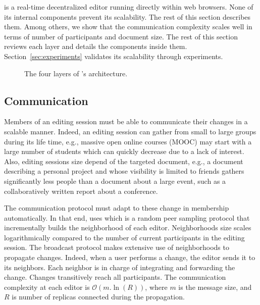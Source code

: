 \CRATE is a real-time decentralized editor running directly within web
browsers. None of its internal components prevent its scalability. The rest of
this section describes them. Among others, we show that the communication
complexity scales well in terms of number of participants and document size. The
rest of this section reviews each layer and details the components inside
them. Section~\ref{sec:experiments} validates its scalability through
experiments.

\begin{figure}
  \centering
  
  \caption{\label{fig:architecture}The four layers of \CRATE's architecture.}
\end{figure}

\subsection{Communication}
\label{subsec:communication}

Members of an editing session must be able to communicate their changes in a
scalable manner. Indeed, an editing session can gather from small to large
groups during its life time, e.g., massive open online courses (MOOC) may start
with a large number of students which can quickly decrease due to a lack of
interest. Also, editing sessions size depend of the targeted document, e.g., a
document describing a personal project and whose visibility is limited to
friends gathers significantly less people than a document about a large event,
such as a collaboratively written report about a conference.

The communication protocol must adapt to these change in membership
automatically. In that end, \CRATE uses \SPRAY which is a random peer sampling
protocol that incrementally builds the neighborhood of each editor.
Neighborhoods size scales logarithmically compared to the number of current
participants in the editing session. The broadcast protocol makes extensive use
of neighborhoods to propagate changes. Indeed, when a user performs a change,
the editor sends it to its neighbors. Each neighbor is in charge of integrating
and forwarding the change. Changes transitively reach all participants. The
communication complexity at each editor is $\mathcal{O}(m.\ln(R))$, where $m$ is
the message size, and $R$ is number of replicas connected during the
propagation.



